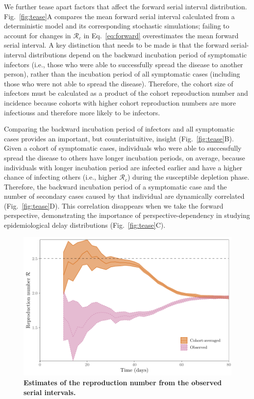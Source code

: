 \documentclass[12pt]{article}
\newcommand{\eref}[1]{Eq.~\ref{eq:#1}}
\newcommand{\fref}[1]{Fig.~\ref{fig:#1}}
\begin{document}
We further tease apart factors that affect the forward serial interval distribution.
\fref{tease}A compares the mean forward serial interval calculated from a deterministic model and its corresponding stochastic simulations;
failing to account for changes in $\mathcal R_c$ in \eref{forward} overestimates the mean forward serial interval.
A key distinction that needs to be made is that the forward serial-interval distributions depend on the backward incubation period of symptomatic infectors (i.e., those who were able to successfully spread the disease to another person), rather than the incubation period of all symptomatic cases (including those who were not able to spread the disease).
Therefore, the cohort size of infectors must be calculated as a product of the cohort reproduction number and incidence because cohorts with higher cohort reproduction numbers are more infectiouss and therefore more likely to be infectors.

Comparing the backward incubation period of infectors and all symptomatic cases provides an important, but counterintuitive, insight (\fref{tease}B).
Given a cohort of symptomatic cases, individuals who were able to successfully spread the disease to others have longer incubation periods, on average,
because individuals with longer incubation period are infected earlier and have a higher chance of infecting others (i.e., higher $\mathcal R_c$) during the susceptible depletion phase.
Therefore, the backward incubation period of a symptomatic case and the number of secondary cases caused by that individual are dynamically correlated (\fref{tease}D).
This correlation disappears when we take the forward perspective, demonstrating the importance of perspective-dependency in studying epidemiological delay distributions (\fref{tease}C).

\begin{figure}[!th]
\includegraphics[width=\textwidth]{observedrR.pdf}
\caption{
\textbf{Estimates of the reproduction number from the observed serial intervals.}
}
\label{fig:obsrR}
\end{figure}
\end{document}
